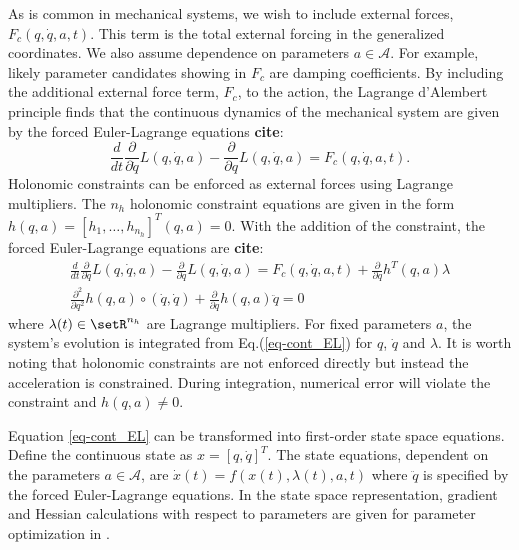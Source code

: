 \documentclass[letterpaper, 10pt, conference]{ieeeconf}
\begin{document}
As is common in mechanical systems, we wish to include external forces, $F_c(q,\dot{q},a,t)$.  This term is the total external forcing in the generalized coordinates.  We also assume dependence on parameters $a\in\mathcal{A}$.  For example, likely parameter candidates showing in $F_c$ are damping coefficients.  By including the additional external force term, $F_c$, to the action, the Lagrange d'Alembert principle finds that the continuous dynamics of the mechanical system are given by the forced Euler-Lagrange equations \textbf{cite}:
\[
\frac{d}{d t}\frac{\partial}{\partial \dot{q}}L(q,\dot{q},a) - \frac{\partial}{\partial q}L(q,\dot{q},a) = F_c(q,\dot{q},a,t).
\]
Holonomic constraints can be enforced as external forces using Lagrange multipliers.  The $n_h$ holonomic constraint equations are given in the form $h(q,a)= [h_1,\ldots,h_{n_h}]^T(q,a) = 0$.  With the addition of the constraint, the forced Euler-Lagrange equations are \textbf{cite}:
\begin{equation}
\begin{array}{c}
\frac{d}{d t}\frac{\partial}{\partial \dot{q}}L(q,\dot{q},a) - \frac{\partial}{\partial q}L(q,\dot{q},a) = F_c(q,\dot{q},a,t) + \frac{\partial}{\partial q}h^T(q,a)\lambda\\
\frac{\partial^2}{\partial q^2}h(q,a)\circ(\dot{q},\dot{q}) + \frac{\partial}{\partial q}h(q,a)\ddot{q} = 0 
\end{array}
\label{eq-cont_EL}
\end{equation}
where $\lambda(t)\in\setR^{n_h}$ are Lagrange multipliers.  For fixed parameters $a$, the system's evolution is integrated from Eq.(\ref{eq-cont_EL}) for $q$, $\dot{q}$ and $\lambda$.  It is worth noting that holonomic constraints are not enforced directly but instead the acceleration is constrained.  During integration, numerical error will violate the constraint and $h(q,a)\neq 0$.

Equation \ref{eq-cont_EL} can be transformed into first-order state space equations.  Define the continuous state as $x = [q,\dot{q}]^T$.  The state equations, dependent on the parameters $a\in\mathcal{A}$, are $\dot{x}(t) = f(x(t),\lambda(t),a,t)$ where $\ddot{q}$ is specified by the forced Euler-Lagrange equations.  In the state space representation, gradient and Hessian calculations with respect to parameters are given for parameter optimization in \cite{miller_murphey}.
\end{document}
